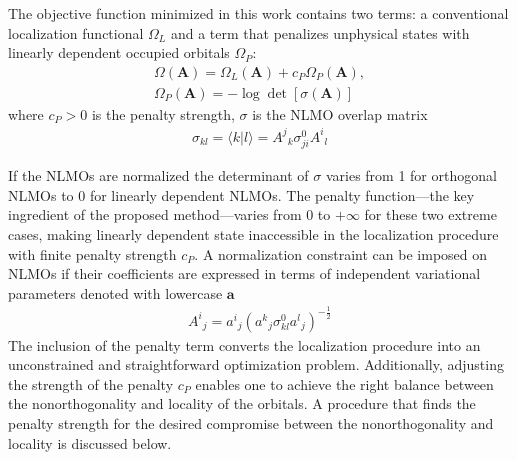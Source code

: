 \documentclass[aps,prl,reprint,amsmath,amssymb]{revtex4-1}
\newcommand{\braket}[2]{\ensuremath{\langle #1 \vert #2 \rangle}} %
\begin{document}
The objective function minimized in this work contains two terms: a conventional localization functional $\Omega_L$ and a term that penalizes unphysical states with linearly dependent occupied orbitals $\Omega_P$:
%
\begin{equation} \label{eq:fun-pen}
\begin{split}
\Omega(\mathbf{A}) = \Omega_L(\mathbf{A}) + c_P \Omega_P(\mathbf{A}), \\
\Omega_P(\mathbf{A}) = - \log \det \left[ \sigma (\mathbf{A}) \right]
\end{split}
\end{equation}
%
where $c_P > 0$ is the penalty strength, $\sigma$ is the NLMO overlap matrix 
%
\begin{equation}
\begin{split}
\sigma_{kl} = \braket{k}{l} = {A^j}_k \sigma_{ji}^0{A^i}_l
\end{split}
\end{equation}
%

If the NLMOs are normalized the determinant of $\sigma$ varies from 1 for orthogonal NLMOs to 0 for linearly dependent NLMOs. The penalty function---the key ingredient of the proposed method---varies from 0 to $+\infty$ for these two extreme cases, making linearly dependent state inaccessible in the localization procedure with finite penalty strength $c_P$. 
A normalization constraint can be imposed on NLMOs if their coefficients are expressed in terms of independent variational parameters denoted with lowercase $\mathbf{a}$
%
\begin{equation}
\begin{split}
{A^i}_j = {a^i}_{j} ({a^k}_{j} \sigma^0_{kl}{a^l}_{j})^{-\frac{1}{2}}
\end{split}
\end{equation}
%
The inclusion of the penalty term converts the localization procedure into an unconstrained and straightforward optimization problem. Additionally, adjusting the strength of the penalty $c_P$ enables one to achieve the right balance between the nonorthogonality and locality of the orbitals. 
A procedure that finds the penalty strength for the desired compromise between the nonorthogonality and locality is discussed below. 
\end{document}
